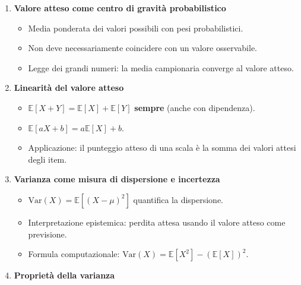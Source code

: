 \documentclass[
  italian,
  letterpaper,
  a4paper,
  11pt,
  open=any]{scrbook}
\providecommand{\tightlist}{%
  \setlength{\itemsep}{0pt}\setlength{\parskip}{0pt}}
\theoremstyle{plain}
\theoremstyle{definition}
\theoremstyle{definition}
\theoremstyle{remark}
\begin{document}
\begin{tcolorbox}[enhanced jigsaw, arc=.35mm, bottomrule=.15mm, bottomtitle=1mm, breakable, colback=white, colbacktitle=quarto-callout-important-color!10!white, colframe=quarto-callout-important-color-frame, coltitle=black, left=2mm, leftrule=.75mm, opacityback=0, opacitybacktitle=0.6, rightrule=.15mm, title=\textcolor{quarto-callout-important-color}{\faExclamation}\hspace{0.5em}{Importante}, titlerule=0mm, toprule=.15mm, toptitle=1mm]

\begin{enumerate}
\def\labelenumi{\arabic{enumi}.}
\tightlist
\item
  \textbf{Valore atteso come centro di gravità probabilistico}

  \begin{itemize}
  \tightlist
  \item
    Media ponderata dei valori possibili con pesi probabilistici.
  \item
    Non deve necessariamente coincidere con un valore osservabile.
  \item
    Legge dei grandi numeri: la media campionaria converge al valore
    atteso.
  \end{itemize}
\item
  \textbf{Linearità del valore atteso}

  \begin{itemize}
  \tightlist
  \item
    \(\mathbb{E}[X + Y] = \mathbb{E}[X] + \mathbb{E}[Y]\)
    \textbf{sempre} (anche con dipendenza).
  \item
    \(\mathbb{E}[aX + b] = a\mathbb{E}[X] + b\).
  \item
    Applicazione: il punteggio atteso di una scala è la somma dei valori
    attesi degli item.
  \end{itemize}
\item
  \textbf{Varianza come misura di dispersione e incertezza}

  \begin{itemize}
  \tightlist
  \item
    \(\text{Var}(X) = \mathbb{E}[(X - \mu)^2]\) quantifica la
    dispersione.
  \item
    Interpretazione epistemica: perdita attesa usando il valore atteso
    come previsione.
  \item
    Formula computazionale:
    \(\text{Var}(X) = \mathbb{E}[X^2] - (\mathbb{E}[X])^2\).
  \end{itemize}
\item
  \textbf{Proprietà della varianza}


\end{enumerate}
\end{tcolorbox}
\end{document}
